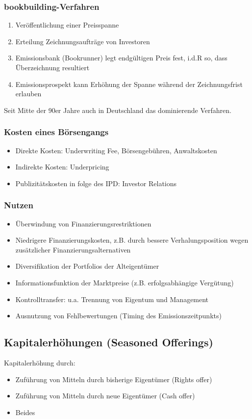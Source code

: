 \subsubsection{bookbuilding-Verfahren}
\begin{enumerate}
	\item Veröffentlichung einer Preisspanne
	\item Erteilung Zeichnungsaufträge von Investoren
	\item Emissionsbank (Bookrunner) legt endgültigen Preis fest, i.d.R so, dass Überzeichnung resultiert
	\item Emissionsprospekt kann Erhöhung der Spanne während der Zeichnungsfrist erlauben
\end{enumerate}
Seit Mitte der 90er Jahre auch in Deutschland das dominierende Verfahren.

\subsubsection{Kosten eines Börsengangs}
\begin{itemize}
	\item Direkte Kosten: Underwriting Fee, Börsengebühren, Anwaltskosten
	\item Indirekte Kosten: Underpricing
	\item Publizitätskosten in folge des IPD: Investor Relations
\end{itemize}

\subsubsection{Nutzen}
\begin{itemize}
	\item Überwindung von Finanzierungsrestriktionen
	\item Niedrigere Finanzierungskosten, z.B. durch bessere Verhalungsposition wegen zusätzlicher Finanzierungsalternativen
	\item Diversifikation der Portfolios der Alteigentümer
	\item Informationsfunktion der Marktpreise (z.B. erfolgsabhängige Vergütung)
	\item Kontrolltransfer: u.a. Trennung von Eigentum und Management
	\item Ausnutzung von Fehlbewertungen (Timing des Emissionszeitpunkts)
\end{itemize}


\subsection{Kapitalerhöhungen (Seasoned Offerings)}
Kapitalerhöhung durch:
\begin{itemize}
	\item Zuführung von Mitteln durch bisherige Eigentümer (Rights offer)
	\item Zuführung von Mitteln durch neue Eigentümer (Cash offer)
	\item Beides
\end{itemize}

